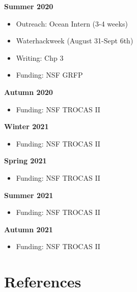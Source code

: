 \documentclass[12pt, letterpaper, twoside]{article}
\begin{document}
\textbf{Summer 2020}
\begin{itemize}
	\item Outreach: Ocean Intern (3-4 weeks)
	\item Waterhackweek (August 31-Sept 6th)
	\item Writing: Chp 3 
	\item Funding: NSF GRFP
\end{itemize}

\textbf{Autumn 2020}

\begin{itemize}
	\item Funding: NSF TROCAS II
\end{itemize}

\textbf{Winter 2021}

\begin{itemize}
	\item Funding: NSF TROCAS II
\end{itemize}

\textbf{Spring 2021} 

\begin{itemize}
	\item Funding: NSF TROCAS II
\end{itemize}

\textbf{Summer 2021} 

\begin{itemize}
	\item Funding: NSF TROCAS II
\end{itemize}

\textbf{Autumn 2021} 

\begin{itemize}
	\item Funding: NSF TROCAS II
\end{itemize}



\newpage

\section{References}

\printbibliography[heading=none]
\end{document}
